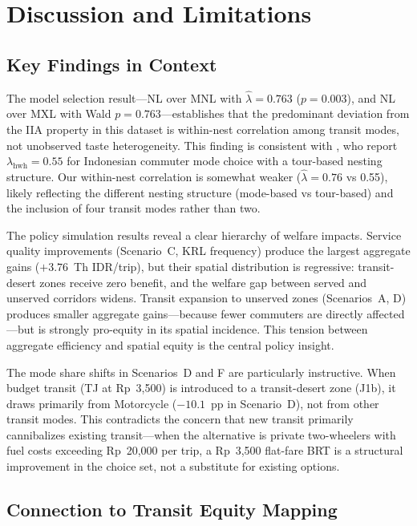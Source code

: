 \documentclass[12pt,a4paper]{article}
\begin{document}
\section{Discussion and Limitations}

\subsection{Key Findings in Context}

The model selection result---NL over MNL with $\hat{\lambda} = 0.763$ ($p = 0.003$), and NL over MXL with Wald $p = 0.763$---establishes that the predominant deviation from the IIA property in this dataset is within-nest correlation among transit modes, not unobserved taste heterogeneity. This finding is consistent with \citet{bastarianto2019}, who report $\lambda_{\text{hwh}} = 0.55$ for Indonesian commuter mode choice with a tour-based nesting structure. Our within-nest correlation is somewhat weaker ($\hat{\lambda} = 0.76$ vs 0.55), likely reflecting the different nesting structure (mode-based vs tour-based) and the inclusion of four transit modes rather than two.

The policy simulation results reveal a clear hierarchy of welfare impacts. Service quality improvements (Scenario~C, KRL frequency) produce the largest aggregate gains ($+3.76$~Th IDR/trip), but their spatial distribution is regressive: transit-desert zones receive zero benefit, and the welfare gap between served and unserved corridors widens. Transit expansion to unserved zones (Scenarios~A, D) produces smaller aggregate gains---because fewer commuters are directly affected---but is strongly pro-equity in its spatial incidence. This tension between aggregate efficiency and spatial equity is the central policy insight.

The mode share shifts in Scenarios~D and F are particularly instructive. When budget transit (TJ at Rp~3,500) is introduced to a transit-desert zone (J1b), it draws primarily from Motorcycle ($-10.1$~pp in Scenario~D), not from other transit modes. This contradicts the concern that new transit primarily cannibalizes existing transit---when the alternative is private two-wheelers with fuel costs exceeding Rp~20,000 per trip, a Rp~3,500 flat-fare BRT is a structural improvement in the choice set, not a substitute for existing options.

\subsection{Connection to Transit Equity Mapping}
\end{document}
